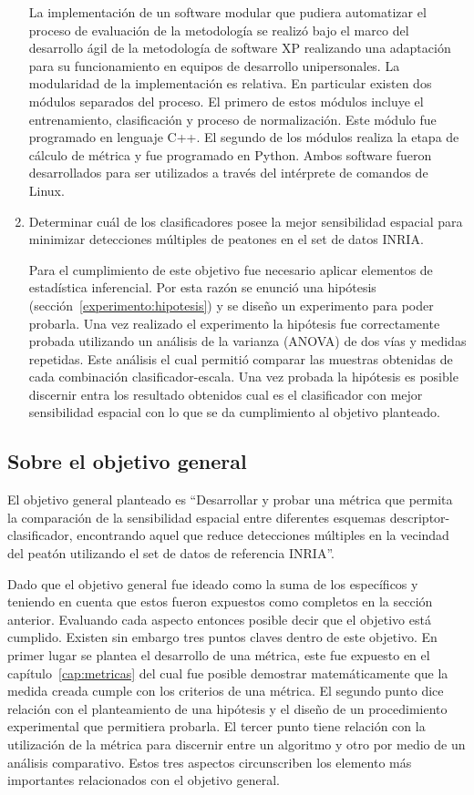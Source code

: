 \begin{enumerate}
\subitem La implementación de un software modular que pudiera automatizar el proceso de evaluación de la metodología se realizó bajo el marco del desarrollo ágil de la metodología de software XP realizando una adaptación para su funcionamiento en equipos de desarrollo unipersonales. La modularidad de la implementación es relativa. En particular existen dos módulos separados del proceso. El primero de estos módulos incluye el entrenamiento, clasificación y proceso de normalización. Este módulo fue programado en lenguaje C++. El segundo de los módulos realiza la etapa de cálculo de métrica y fue programado en Python. Ambos software fueron desarrollados para ser utilizados a través del intérprete de comandos de Linux.

\item Determinar cuál de los clasificadores posee la mejor sensibilidad espacial para minimizar detecciones múltiples de peatones en el set de datos INRIA.

\subitem Para el cumplimiento de este objetivo fue necesario aplicar elementos de estadística inferencial. Por esta razón se enunció una hipótesis (sección~\ref{experimento:hipotesis}) y se diseño un experimento para poder probarla. Una vez realizado el experimento la hipótesis fue correctamente probada utilizando un análisis de la varianza (ANOVA) de dos vías y medidas repetidas. Este análisis el cual permitió comparar las muestras obtenidas de cada combinación clasificador-escala. Una vez probada la hipótesis es posible discernir entra los resultado obtenidos cual es el clasificador con mejor sensibilidad espacial  con lo que se da cumplimiento al objetivo planteado. 

\end{enumerate}


\subsection{Sobre el objetivo general}


El objetivo general planteado es ``Desarrollar y probar una métrica que permita la comparación de la sensibilidad espacial entre diferentes esquemas descriptor-clasificador, encontrando aquel que reduce detecciones múltiples en la vecindad del peatón utilizando el set de datos de referencia INRIA''.

Dado que el objetivo general fue ideado como la suma de los específicos y teniendo en cuenta que estos fueron expuestos como completos en la sección anterior. Evaluando cada aspecto entonces posible decir que el objetivo está cumplido. Existen sin embargo tres puntos claves dentro de este objetivo. En primer lugar se plantea el desarrollo de una métrica, este  fue expuesto en el capítulo~\ref{cap:metricas} del cual fue posible demostrar matemáticamente que la medida creada cumple con los criterios de una métrica. El segundo punto dice relación con el planteamiento de una hipótesis y  el diseño de un procedimiento experimental que permitiera probarla. El tercer punto tiene relación con la utilización de la métrica para discernir entre un algoritmo y otro por medio de un análisis comparativo. Estos tres aspectos circunscriben los elemento más importantes relacionados con el objetivo general. 

